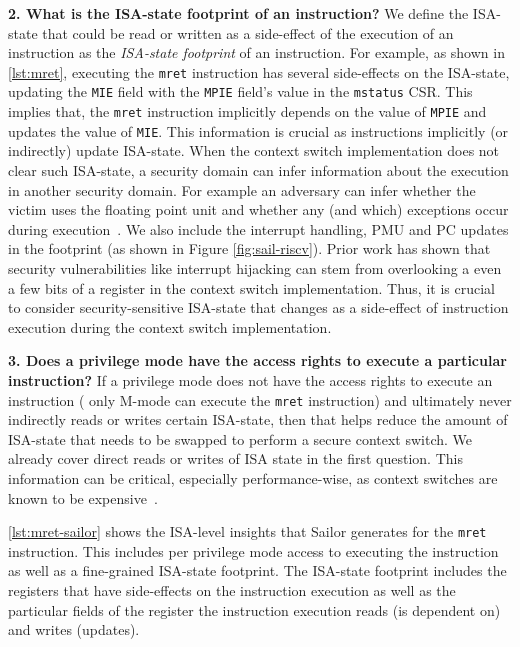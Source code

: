 \textbf{2. What is the ISA-state footprint of an instruction?} 
We define the ISA-state that could be read or written as a side-effect of the execution of an instruction as the \textit{ISA-state footprint} of an instruction. 
For example, as shown in \autoref{lst:mret}, executing the \texttt{mret} instruction has several side-effects on the ISA-state, \eg{} updating the \texttt{MIE} field with the \texttt{MPIE} field's value in the \texttt{mstatus} CSR. 
This implies that, the \texttt{mret} instruction implicitly depends on the value of \texttt{MPIE} and updates the value of \texttt{MIE}. 
This information is crucial as instructions implicitly (or indirectly) update ISA-state.
When the context switch implementation does not clear such ISA-state, a security domain can infer information about the execution in another security domain. 
For example an adversary can infer whether the victim uses the floating point unit and whether any (and which) exceptions occur during execution~\cite{dtrap-fpu}.
We also include the interrupt handling, PMU and PC updates in the footprint (as shown in Figure \ref{fig:sail-riscv}). 
Prior work has shown that security vulnerabilities like interrupt hijacking can stem from overlooking a even a few bits of a register in the context switch implementation\cite{intel-tdx-sec}. 
Thus, it is crucial to consider security-sensitive ISA-state that changes as a side-effect of instruction execution during the context switch implementation. 

\textbf{3. Does a privilege mode have the access rights to execute a particular instruction?} 
If a privilege mode does not have the access rights to execute an instruction (\eg{} only M-mode can execute the \texttt{mret} instruction) and ultimately never indirectly reads or writes certain ISA-state, then that helps reduce the amount of ISA-state that needs to be swapped to perform a secure context switch.
We already cover direct reads or writes of ISA state in the first question.
This information can be critical, especially performance-wise, as context switches are known to be expensive~\cite{context-switch-cost, context-switch-cost-hotos}.

\autoref{lst:mret-sailor} shows the ISA-level insights that Sailor generates for the \texttt{mret} instruction. 
This includes per privilege mode access to 
executing the instruction as well as a fine-grained ISA-state footprint. 
The ISA-state footprint includes the registers that have side-effects on the instruction execution as well as the particular fields of the register the instruction execution reads (is dependent on) and writes (updates). 

